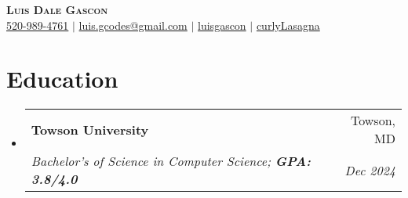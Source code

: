\documentclass[letterpaper,11pt]{article}
\makeatletter
\newcommand{\resumeItem}[1]{
  \item\small{
    {#1 \vspace{-2pt}}
  }
}
\newcommand{\resumeSubheading}[4]{
  \vspace{-2pt}\item
    \begin{tabular*}{0.97\textwidth}[t]{l@{\extracolsep{\fill}}r}
      \textbf{#1} & #2 \\
      \textit{\small#3} & \textit{\small #4} \\
    \end{tabular*}\vspace{-7pt}
}
\newcommand{\resumeSubHeadingListStart}{\begin{itemize}[leftmargin=0.15in, label={}]}
\newcommand{\resumeSubHeadingListEnd}{\end{itemize}}
\newcommand{\resumeItemListStart}{\begin{itemize}}
\newcommand{\resumeItemListEnd}{\end{itemize}\vspace{-5pt}}
\makeatother
\begin{document}

\begin{center}
  \textbf{\Huge \scshape Luis Dale Gascon} \\ \vspace{3pt}
  \small
  \faMobile \hspace{.5pt} \href{tel:5209894761}{520-989-4761}
  $|$
  \faAt \hspace{.5pt} \href{mailto:luis.gcodes@gmail.com}{luis.gcodes@gmail.com}
  $|$
  \faLinkedinSquare \hspace{.5pt} \href{https://www.linkedin.com/in/luisgascon/}{luisgascon}
  $|$
  \faGithub \hspace{.5pt} \href{https://github.com/curlyLasagna}{curlyLasagna}
\end{center}




\section{Education}
\vspace{3pt}
\resumeSubHeadingListStart

\resumeSubheading
{Towson University}{Towson, MD}
{Bachelor's of Science in Computer Science; \textbf{GPA: 3.8/4.0}}{Dec 2024}
\vspace{3pt}
\resumeSubHeadingListEnd




\end{document}
